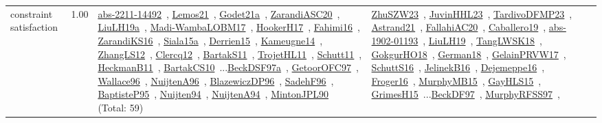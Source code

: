 {\begin{longtable}{p{3cm}r>{\raggedright\arraybackslash}p{6cm}>{\raggedright\arraybackslash}p{6cm}>{\raggedright\arraybackslash}p{8cm}}
\index{constraint satisfaction}\index{CP!constraint satisfaction}constraint satisfaction &  1.00 & \href{../works/abs-2211-14492.pdf}{abs-2211-14492}~\cite{abs-2211-14492}, \href{../works/Lemos21.pdf}{Lemos21}~\cite{Lemos21}, \href{../works/Godet21a.pdf}{Godet21a}~\cite{Godet21a}, \href{../works/ZarandiASC20.pdf}{ZarandiASC20}~\cite{ZarandiASC20}, \href{../works/LiuLH19a.pdf}{LiuLH19a}~\cite{LiuLH19a}, \href{../works/Madi-WambaLOBM17.pdf}{Madi-WambaLOBM17}~\cite{Madi-WambaLOBM17}, \href{../works/HookerH17.pdf}{HookerH17}~\cite{HookerH17}, \href{../works/Fahimi16.pdf}{Fahimi16}~\cite{Fahimi16}, \href{../works/ZarandiKS16.pdf}{ZarandiKS16}~\cite{ZarandiKS16}, \href{../works/Siala15a.pdf}{Siala15a}~\cite{Siala15a}, \href{../works/Derrien15.pdf}{Derrien15}~\cite{Derrien15}, \href{../works/Kameugne14.pdf}{Kameugne14}~\cite{Kameugne14}, \href{../works/ZhangLS12.pdf}{ZhangLS12}~\cite{ZhangLS12}, \href{../works/Clercq12.pdf}{Clercq12}~\cite{Clercq12}, \href{../works/BartakS11.pdf}{BartakS11}~\cite{BartakS11}, \href{../works/TrojetHL11.pdf}{TrojetHL11}~\cite{TrojetHL11}, \href{../works/Schutt11.pdf}{Schutt11}~\cite{Schutt11}, \href{../works/HeckmanB11.pdf}{HeckmanB11}~\cite{HeckmanB11}, \href{../works/BartakCS10.pdf}{BartakCS10}~\cite{BartakCS10}...\href{../works/BeckDSF97a.pdf}{BeckDSF97a}~\cite{BeckDSF97a}, \href{../works/GetoorOFC97.pdf}{GetoorOFC97}~\cite{GetoorOFC97}, \href{../works/Wallace96.pdf}{Wallace96}~\cite{Wallace96}, \href{../works/NuijtenA96.pdf}{NuijtenA96}~\cite{NuijtenA96}, \href{../works/BlazewiczDP96.pdf}{BlazewiczDP96}~\cite{BlazewiczDP96}, \href{../works/SadehF96.pdf}{SadehF96}~\cite{SadehF96}, \href{../works/BaptisteP95.pdf}{BaptisteP95}~\cite{BaptisteP95}, \href{../works/Nuijten94.pdf}{Nuijten94}~\cite{Nuijten94}, \href{../works/NuijtenA94.pdf}{NuijtenA94}~\cite{NuijtenA94}, \href{../works/MintonJPL90.pdf}{MintonJPL90}~\cite{MintonJPL90} (Total: 59) & \href{../works/ZhuSZW23.pdf}{ZhuSZW23}~\cite{ZhuSZW23}, \href{../works/JuvinHHL23.pdf}{JuvinHHL23}~\cite{JuvinHHL23}, \href{../works/TardivoDFMP23.pdf}{TardivoDFMP23}~\cite{TardivoDFMP23}, \href{../works/Astrand21.pdf}{Astrand21}~\cite{Astrand21}, \href{../works/FallahiAC20.pdf}{FallahiAC20}~\cite{FallahiAC20}, \href{../works/Caballero19.pdf}{Caballero19}~\cite{Caballero19}, \href{../works/abs-1902-01193.pdf}{abs-1902-01193}~\cite{abs-1902-01193}, \href{../works/LiuLH19.pdf}{LiuLH19}~\cite{LiuLH19}, \href{../works/TangLWSK18.pdf}{TangLWSK18}~\cite{TangLWSK18}, \href{../works/GokgurHO18.pdf}{GokgurHO18}~\cite{GokgurHO18}, \href{../works/German18.pdf}{German18}~\cite{German18}, \href{../works/GelainPRVW17.pdf}{GelainPRVW17}~\cite{GelainPRVW17}, \href{../works/SchuttS16.pdf}{SchuttS16}~\cite{SchuttS16}, \href{../works/JelinekB16.pdf}{JelinekB16}~\cite{JelinekB16}, \href{../works/Dejemeppe16.pdf}{Dejemeppe16}~\cite{Dejemeppe16}, \href{../works/Froger16.pdf}{Froger16}~\cite{Froger16}, \href{../works/MurphyMB15.pdf}{MurphyMB15}~\cite{MurphyMB15}, \href{../works/GayHLS15.pdf}{GayHLS15}~\cite{GayHLS15}, \href{../works/GrimesH15.pdf}{GrimesH15}~\cite{GrimesH15}...\href{../works/BeckDF97.pdf}{BeckDF97}~\cite{BeckDF97}, \href{../works/MurphyRFSS97.pdf}{MurphyRFSS97}~\cite{MurphyRFSS97}, 
\end{longtable}}
